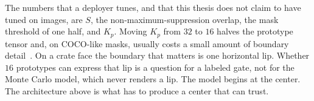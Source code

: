 The numbers that a deployer tunes, and that this thesis does not claim to have tuned on images, are $S$, the non-maximum-suppression overlap, the mask threshold of one half, and $K_{p}$. Moving $K_{p}$ from $32$ to $16$ halves the prototype tensor and, on COCO-like masks, usually costs a small amount of boundary detail~\cite{bolya2019yolact,zhao2023fastsam}. On a crate face the boundary that matters is one horizontal lip. Whether $16$ prototypes can express that lip is a question for a labeled gate, not for the Monte Carlo model, which never renders a lip. The model begins at the center. The architecture above is what has to produce a center that  can trust.
